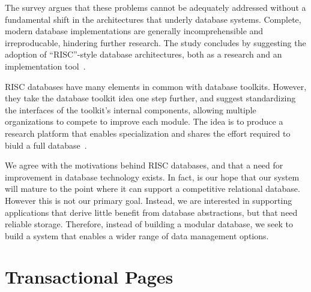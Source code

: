 \documentclass[letterpaper,twocolumn,10pt]{article}
\begin{document}
The survey argues that these problems cannot be adequately addressed without a fundamental shift in the architectures that underly database systems.  Complete, modern database
implementations are generally incomprehensible and
irreproducable, hindering further research.  The study concludes 
by suggesting the adoption of ``RISC''-style database architectures, both as a research and an
implementation tool~\cite{riscDB}.  

RISC databases have many elements in common with
database toolkits.  However, they take the database toolkit idea one
step further, and suggest standardizing the interfaces of the
toolkit's internal components, allowing multiple organizations to
compete to improve each module.  The idea is to produce a research
platform that enables specialization and shares the effort required to biuld a full database~\cite{riscDB}.

We agree with the motivations behind RISC databases, and that a need
for improvement in database technology exists.  In fact, is our hope
that our system will mature to the point where it can support
a competitive relational database.  However this is
not our primary goal.  
Instead, we are interested in supporting applications that derive
little benefit from database abstractions, but that need reliable
storage.  Therefore, instead of building a modular database, we seek
to build a system that enables a wider range of data management options.





\section{Transactional Pages}
\end{document}
